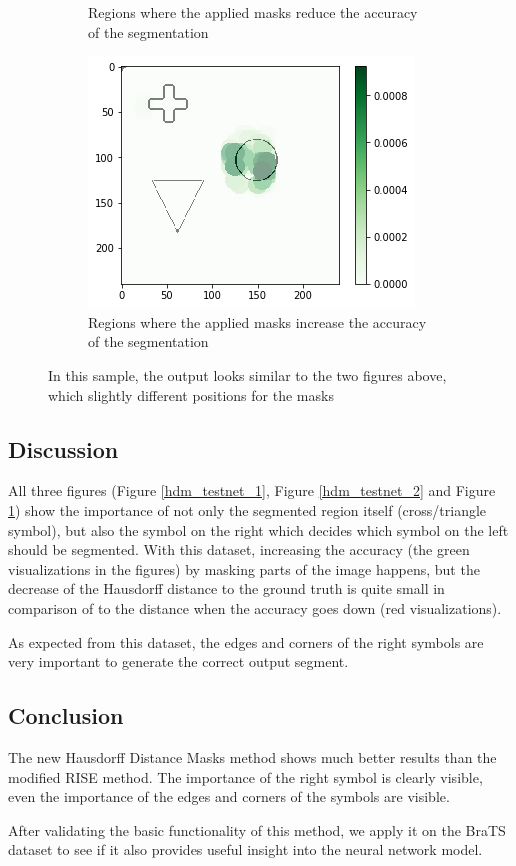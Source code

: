 \begin{figure}[H]
\begin{subfigure}[t]{.34\textwidth}
        \caption{Regions where the applied masks reduce the accuracy of the segmentation}
    \end{subfigure}\hfill%
    \begin{subfigure}[t]{.34\textwidth}
        \centering
        \includegraphics[width=\linewidth]{chapters/06_hdm/testnet/11.png}
        \caption{Regions where the applied masks increase the accuracy of the segmentation}
    \end{subfigure}
    \caption{In this sample, the output looks similar to the two figures above, which slightly different positions for the masks}
    \label{hdm_testnet_3}
\end{figure}

\subsection{Discussion}
All three figures (Figure \ref{hdm_testnet_1}, Figure \ref{hdm_testnet_2} and Figure \ref{hdm_testnet_3}) show the importance of not only the segmented region itself (cross/triangle symbol), but also the symbol on the right which decides which symbol on the left should be segmented. With this dataset, increasing the accuracy (the green visualizations in the figures) by masking parts of the image happens, but the decrease of the Hausdorff distance to the ground truth is quite small in comparison of to the distance when the accuracy goes down (red visualizations).

As expected from this dataset, the edges and corners of the right symbols are very important to generate the correct output segment.

\subsection{Conclusion}
The new Hausdorff Distance Masks method shows much better results than the modified RISE method. The importance of the right symbol is clearly visible, even the importance of the edges and corners of the symbols are visible.

After validating the basic functionality of this method, we apply it on the BraTS dataset to see if it also provides useful insight into the neural network model.
